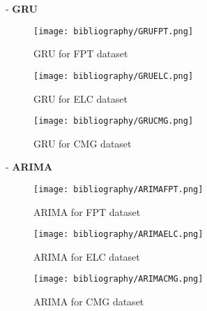 \documentclass{ieeeojies}
\begin{document}
- \textbf{GRU}\\
\begin{figure}[H]
  \centering
  \begin{minipage}{0.8\linewidth}
    \centering
    \texttt{[image: bibliography/GRUFPT.png]}
        \caption{GRU for FPT dataset}
    \label{fig:}
  \end{minipage}
\end{figure}
\begin{figure}[H]
  \centering
  \begin{minipage}{0.8\linewidth}
    \centering
    \texttt{[image: bibliography/GRUELC.png]}
            \caption{GRU for ELC dataset}
    \label{fig:}
  \end{minipage}
\end{figure}
\begin{figure}[H]
  \centering
  \begin{minipage}{0.8\linewidth}
    \centering
    \texttt{[image: bibliography/GRUCMG.png]}
            \caption{GRU for CMG dataset}
    \label{fig:}
  \end{minipage}
\end{figure}

- \textbf{ARIMA}\\
\begin{figure}[H]
  \centering
  \begin{minipage}{0.8\linewidth}
    \centering
    \texttt{[image: bibliography/ARIMAFPT.png]}
            \caption{ARIMA for FPT dataset}
    \label{fig:}
  \end{minipage}
\end{figure}
\begin{figure}[H]
  \centering
  \begin{minipage}{0.8\linewidth}
    \centering
    \texttt{[image: bibliography/ARIMAELC.png]}
                \caption{ARIMA for ELC dataset}
    \label{fig:}
  \end{minipage}
\end{figure}
\begin{figure}[H]
  \centering
  \begin{minipage}{0.8\linewidth}
    \centering
    \texttt{[image: bibliography/ARIMACMG.png]}
                \caption{ARIMA for CMG dataset}
    \label{fig:}
  \end{minipage}
\end{figure}
\end{document}
